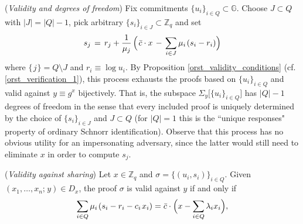 \documentclass{iacrtrans}
\begin{document}
\begin{rem}\label{orst_validity_degrees_of_freedom}
(\textit{Validity and degrees of freedom})
Fix commitments $\{u_i\}_{i \in Q} \subset \mathbb{G}$.
Choose $J \subset Q$ with $|J| = |Q| - 1$,
pick arbitrary $\{s_i\}_{i \in J} \subset \mathbb{Z}_q$
and set
\vspace{5pt}
\begin{equation*}\label{orst_validity_degrees_of_freedom_formula}
s_j
	\hspace{1.5pt}
	=
	\hspace{1.5pt}
	r_j + \frac{1}{\mu_j}
	\hspace{1.5pt}
	\Big(
		\hspace{1.0pt}
		\bar{c}\cdot x
		\hspace{1.5pt}
		-
		\hspace{1.5pt}
		\sum_{i \in J}
			\mu_i
			\hspace{1pt}
			(s_i - r_i)
	\Big)
\vspace{5pt}
\end{equation*}
where $\{\hspace{1pt}j\hspace{1pt}\} = Q \setminus J$
and $r_i \equiv \log u_i$.
By Proposition \ref{orst_validity_conditions}
(cf. \eqref{orst_verification_1}),
this process exhausts the proofs
based on $\{u_i\}_{i \in Q}$ and valid against
$y \equiv g ^ x$
bijectively.
That is, the subspace
$\Sigma_y \big[\{u_i\}_{i \in Q}\big]$
has $|Q| - 1$ degrees of freedom in the sense that
every included proof is uniquely determined
by the choice of $\{s_i\}_{i \in J}$
and $J \subset Q$ (for $|Q| = 1$
this is the ``unique responses" property
of ordinary Schnorr identification).
Observe that this process has no obvious utility
for an impersonating adversary,
since the latter would still need
to eliminate $x$ in order to compute $s_j$.
\end{rem}

\begin{prop}\label{orst_validity_against_sharing_prop}
\textup{(\textit{Validity against sharing})}
Let $x \in \mathbb{Z}_q$ and
$\sigma = \{(u_i, s_i)\}_{i \in Q}$.
Given $(x_1, \dots, x_n;\hspace{1pt} y) \in D_x$,
the proof $\sigma$ is valid against $y$ if and only if
\vspace{5pt}
\begin{equation}\label{orst_validity_against_sharing}
\sum_{i \in Q} \mu_i\hspace{1pt} (s_i - r_i - c_i\hspace{1pt}x_i)
=
\bar{c} \cdot \Big(x - \sum_{i \in Q} \lambda_i x_i\Big),
\vspace{5pt}
\end{equation}
\end{prop}
\end{document}
